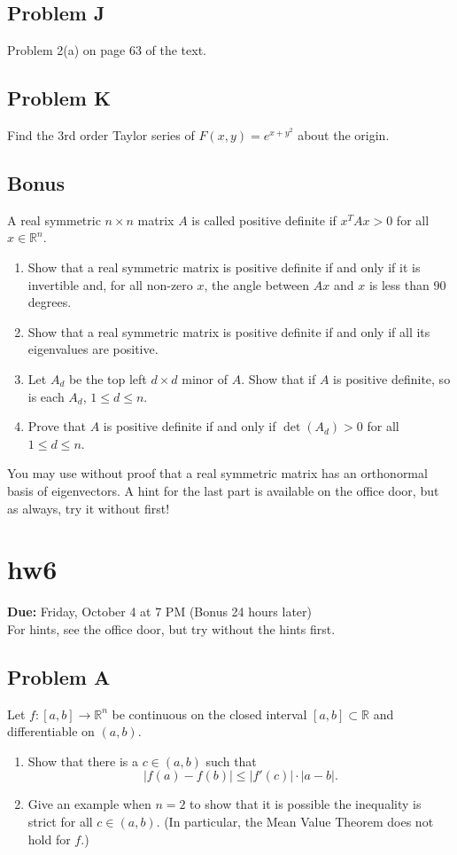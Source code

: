 \documentclass[lang=en,11pt]{template}
\begin{document}
\section*{Problem J}
Problem 2(a) on page 63 of the text.

\section*{Problem K}
Find the 3rd order Taylor series of $F(x, y) = e^{x + y^2}$ about the origin.

\section*{Bonus}
A real symmetric $n \times n$ matrix $A$ is called positive definite if $x^T A x > 0$ for all $x \in \mathbb{R}^n$.
\begin{enumerate}
    \item Show that a real symmetric matrix is positive definite if and only if it is invertible and, for all non-zero $x$, the angle between $Ax$ and $x$ is less than 90 degrees.
    \item Show that a real symmetric matrix is positive definite if and only if all its eigenvalues are positive.
    \item Let $A_d$ be the top left $d \times d$ minor of $A$. Show that if $A$ is positive definite, so is each $A_d$, $1 \leq d \leq n$.
    \item Prove that $A$ is positive definite if and only if $\det(A_d) > 0$ for all $1 \leq d \leq n$.
\end{enumerate}

You may use without proof that a real symmetric matrix has an orthonormal basis of eigenvectors. A hint for the last part is available on the office door, but as always, try it without first!

\chapter{hw6}

\noindent
\textbf{Due:} Friday, October 4 at 7 PM (Bonus 24 hours later)\\
For hints, see the office door, but try without the hints first.

\section*{Problem A}
Let $f : [a, b] \to \mathbb{R}^n$ be continuous on the closed interval $[a, b] \subset \mathbb{R}$ and differentiable on $(a, b)$.
\begin{enumerate}
    \item Show that there is a $c \in (a, b)$ such that
    \[
    |f(a) - f(b)| \leq |f'(c)| \cdot |a - b|.
    \]
    \item Give an example when $n = 2$ to show that it is possible the inequality is strict for all $c \in (a, b)$. (In particular, the Mean Value Theorem does not hold for $f$.)
\end{enumerate}
\end{document}
